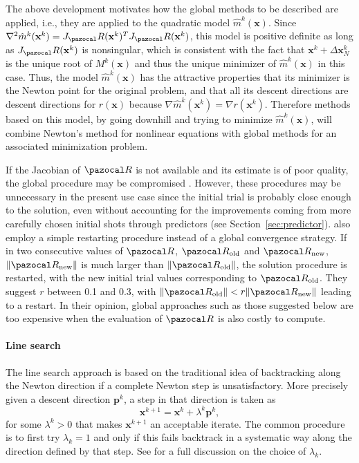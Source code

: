 The above development motivates how the global methods to be described are applied, i.e., they are applied to the quadratic model \(\hat{m}^k(\mathbf x)\).
Since \(\nabla^{2} \hat{m}^k(\mathbf x^k)=J_\pazocal R(\mathbf x^k)^{T} J_\pazocal R(\mathbf x^k)\), this model is positive definite as long as \(J_\pazocal R(\mathbf x^k)\) is nonsingular, which is consistent with the fact that \(\mathbf x^k + \Delta \mathbf x^k_N\) is the unique root of \(M^k(\mathbf x)\) and thus the unique minimizer of \(\hat{m}^k(\mathbf x)\) in this case.
Thus, the model \(\hat{m}^k(\mathbf x)\) has the attractive properties that its minimizer is the Newton point for the original problem, and that all its descent directions are descent directions for \(r(\mathbf x)\) because \(\nabla \hat{m}^k(\mathbf x^k)=\nabla r(\mathbf x^k)\).
Therefore methods based on this model, by going downhill and trying to minimize \(\hat{m}^k(\mathbf x)\), will combine Newton's method for nonlinear equations with global methods for an associated minimization problem.

If the Jacobian of \(\pazocal R\) is not available and its estimate is of poor quality, the global procedure may be compromised \citep{kelley_solving_2003}.
However, these procedures may be unnecessary in the present use case since the initial trial is probably close enough to the solution, even without accounting for the improvements coming from more carefully chosen initial shots through predictors (see Section~\ref{sec:predictor}).
\cite{fang_two_2009} also employ a simple restarting procedure instead of a global convergence strategy.
If in two consecutive values of \(\pazocal R\), \(\pazocal R_\text{old}\) and \(\pazocal R_\text{new}\), \(\|\pazocal R_\text{new}\|\) is much larger than \(\|\pazocal R_\text{old}\|\), the solution procedure is restarted, with the new initial trial values corresponding to \(\pazocal R_\text{old}\).
They suggest \(r\) between 0.1 and 0.3, with \(\|\pazocal R_\text{old}\| < r\|\pazocal R_\text{new}\|\) leading to a restart.
In their opinion, global approaches such as those suggested below are too expensive when the evaluation of \(\pazocal R\) is also costly to compute.

\paragraph{Line search}

The line search approach is based on the traditional idea of backtracking along the Newton direction if a complete Newton step is unsatisfactory.
More precisely given a descent direction \(\mathbf p^k\), a step in that direction is taken as
\begin{equation}
  \mathbf x^{k+1} = \mathbf x^k + \lambda^k\mathbf p^k,
\end{equation}
for some \(\lambda^k>0\) that makes \(\mathbf x^{k+1}\) an acceptable iterate.
The common procedure is to first try \(\lambda_k=1\) and only if this fails backtrack in a systematic way along the direction defined by that step.
See \cite{dennis_numerical_1996} for a full discussion on the choice of \(\lambda_k\).

